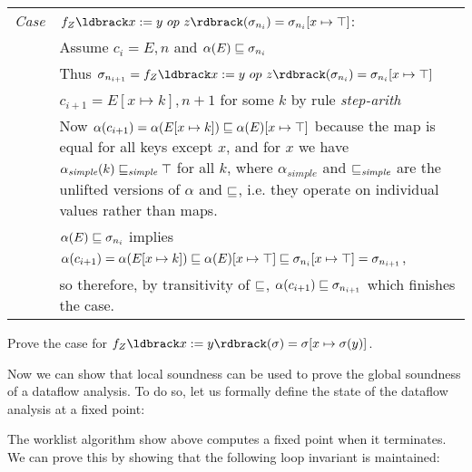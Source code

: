 \documentclass[11pt]{article}
\begin{document}
\begin{tabularx}{\textwidth}{lX}
\\
\emph{Case} & $f_Z\parg{x := y ~op~ z}(\sigma_{n_i}) = \sigma_{n_i}[x \mapsto \top]$: \\
 & Assume $c_i = E,n$ and $\alpha(E) \sqsubseteq \sigma_{n_i}$ \\
 & Thus $\sigma_{n_{i+1}} = f_Z\parg{x := y ~op~ z}(\sigma_{n_i}) = \sigma_{n_i}[x \mapsto \top]$ \\
 & $c_{i+1} = E[x \mapsto k],n+1$ for some $k$ by rule \textit{step-arith} \\
 &  Now $\alpha(c_{i+1}) = \alpha(E[x \mapsto k]) \sqsubseteq \alpha(E)[x \mapsto \top]$ because the map is equal for all keys except $x$, and for $x$ we have $\alpha_\textit{simple}(k) \sqsubseteq_\textit{simple} \top$ for all $k$, where $\alpha_\textit{simple}$ and $\sqsubseteq_\textit{simple}$ are the unlifted versions of $\alpha$ and $\sqsubseteq$, i.e. they operate on individual values rather than maps. \\
 & $\alpha(E) \sqsubseteq \sigma_{n_i}$ implies $\alpha(c_{i+1}) = \alpha(E[x \mapsto k]) \sqsubseteq \alpha(E)[x \mapsto \top] \sqsubseteq \sigma_{n_i}[x \mapsto \top] = \sigma_{n_{i+1}}$, \\
&  so therefore, by transitivity of $\sqsubseteq$, $\alpha(c_{i+1}) \sqsubseteq \sigma_{n_{i+1}}$ which finishes the case. \\
 \end{tabularx}

  Prove the case for $f_Z\parg{x := y}(\sigma) = \sigma[x \mapsto \sigma(y)]$.



Now we can show that local soundness can be used to prove the global soundness of a dataflow analysis.  To do so, let us formally define the state of the dataflow analysis at a fixed point:


\vspace{1em}

\noindent The worklist algorithm show above computes a fixed point when it terminates.  We can prove this by showing that the following loop invariant is maintained:
\end{document}

